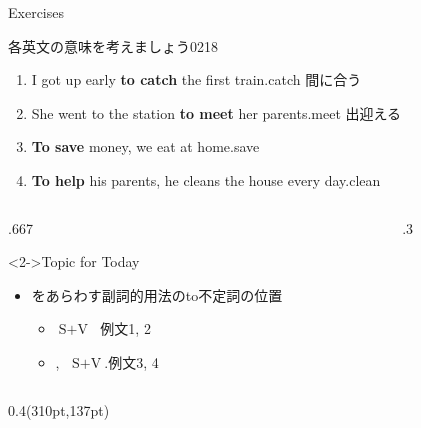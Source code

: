 \documentclass[aspectratio=169,xcolor={dvipsnames,table}]{beamer}
\begin{document}
\begin{frame}[plain,t]{Exercises}

{\small 各英文の意味を考えましょう}\hfill{\tiny 0218}\,{\scriptsize {}}

 \begin{enumerate}
  \item I got up early \textbf{to catch} the first train.\hfill{\scriptsize catch  間に合う}
  \item She went to the station \textbf{to meet} her parents.\hfill{\scriptsize meet  出迎える}
  \item \textbf{To save} money, we eat at home.\hfill{\scriptsize save }
  \item \textbf{To help} his parents, he cleans the house every day.\hfill{\scriptsize clean }
 \end{enumerate}

\begin{columns}[t]
 \begin{column}{.667\textwidth}
  \begin{block}<2->{Topic for Today}
\begin{itemize}[square]\small
 \item {}をあらわす副詞的用法のto不定詞の位置
       \begin{itemize}[circle]\small
\setlength{\itemsep}{5pt} %
	\item $\text{
S} + \text{V}\,\,\,\,$\hfill{\scriptsize 例文1, 2}
	\item {},\,\, $\text{S} + \text{V}$.\hfill{\scriptsize 例文3, 4}
       \end{itemize}
 \end{itemize}
     \end{block}
 \end{column}
\begin{column}{.3\textwidth}
 
\end{column}
\end{columns}
 


\normalsize
\begin{textblock*}{0.4\linewidth}(310pt,137pt)
\end{textblock*}

\end{frame}
\end{document}
